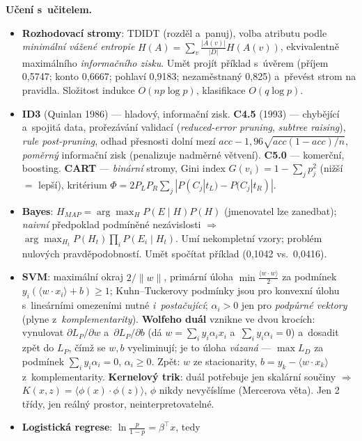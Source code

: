 \documentclass[11pt,a4paper]{article}
\theoremstyle{definition}
\begin{document}
\textbf{Učení s~učitelem.}
\begin{itemize}
\item \textbf{Rozhodovací stromy}: TDIDT (rozděl a~panuj), volba atributu podle
      \emph{minimální vážené entropie} $H(A)=\sum_v\frac{|A(v)|}{|D|}H(A(v))$, ekvivalentně
      maximálního \emph{informačního zisku}. Umět projít příklad s~úvěrem (příjem 0,5747;
      konto 0,6667; pohlaví 0,9183; nezaměstnaný 0,825) a~převést strom na pravidla.
      Složitost indukce $O(np\log p)$, klasifikace $O(q\log p)$.
\item \textbf{ID3} (Quinlan 1986) --- hladový, informační zisk. \textbf{C4.5} (1993) ---
      chybějící a~spojitá data, prořezávání validací (\emph{reduced-error pruning},
      \emph{subtree raising}), \emph{rule post-pruning}, odhad přesnosti dolní mezí
      $\mathit{acc}-1{,}96\sqrt{\mathit{acc}(1-\mathit{acc})/n}$, \emph{poměrný} informační
      zisk (penalizuje nadměrné větvení). \textbf{C5.0} --- komerční, boosting.
      \textbf{CART} --- \emph{binární} stromy, Gini index $G(v_i)=1-\sum_j p_j^2$ (nižší $=$
      lepší), kritérium $\Phi=2P_LP_R\sum_j|P(C_j|t_L)-P(C_j|t_R)|$.
\item \textbf{Bayes}: $H_{MAP}=\arg\max_H P(E\mid H)P(H)$ (jmenovatel lze zanedbat);
      \emph{naivní} předpoklad podmíněné nezávislosti $\Rightarrow$
      $\arg\max_{H_t}P(H_t)\prod_i P(E_i\mid H_t)$. Umí nekompletní vzory; problém nulových
      pravděpodobností. Umět spočítat příklad (0,1042 vs.\ 0,0416).
\item \textbf{SVM}: maximální okraj $2/\|w\|$, primární úloha $\min\frac{\langle w\cdot
      w\rangle}{2}$ za podmínek $y_i(\langle w\cdot x_i\rangle+b)\ge 1$; Kuhn--Tuckerovy
      podmínky jsou pro konvexní úlohu s~lineárními omezeními nutné \emph{i~postačující};
      $\alpha_i>0$ jen pro \emph{podpůrné vektory} (plyne z~\emph{komplementarity}).
      \textbf{Wolfeho duál} vznikne ve dvou krocích: vynulovat $\partial L_P/\partial w$
      a~$\partial L_P/\partial b$ (dá $w=\sum_i y_i\alpha_i x_i$ a~$\sum_i y_i\alpha_i=0$)
      a~dosadit zpět do $L_P$, čímž se $w,b$ vyeliminují; je to úloha \emph{vázaná}
      --- $\max L_D$ za podmínek $\sum_i y_i\alpha_i=0$, $\alpha_i\ge 0$. Zpět:
      $w$ ze stacionarity, $b=y_k-\langle w\cdot x_k\rangle$ z~komplementarity.
      \textbf{Kernelový trik}:
      duál potřebuje jen skalární součiny $\Rightarrow$ $K(x,z)=\langle\phi(x)\cdot\phi(z)\rangle$,
      $\phi$ nikdy nevyčíslíme (Mercerova věta). Jen 2 třídy, jen reálný prostor,
      neinterpretovatelné.
\item \textbf{Logistická regrese}: $\ln\frac{p}{1-p}=\beta^{\!\top}x$, tedy

\end{itemize}
\end{document}
